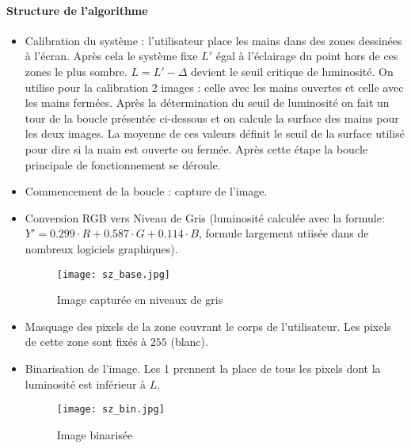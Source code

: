 \paragraph{Structure de l'algorithme}
\begin{itemize}
    \item  Calibration du système : l'utilisateur place les mains dans des zones dessinées à l'écran. Après cela le système fixe $L'$ égal à l'éclairage du point hors de ces zones le plus sombre. $L=L'-\Delta$ devient le seuil critique de luminosité. On utilise pour la calibration 2 images : celle avec les mains ouvertes et celle avec les mains fermées. Après la détermination du seuil de luminosité on fait un tour de la boucle présentée ci-dessous et on calcule la surface des mains pour les deux images. La moyenne de ces valeurs définit le seuil de la surface utilisé pour dire si la main est ouverte ou fermée. Après cette étape la boucle principale de fonctionnement se déroule.
    \item Commencement de la boucle : capture de l'image.
    \item Conversion RGB vers Niveau de Gris (luminosité calculée avec la formule: $Y'=0.299 \cdot R + 0.587 \cdot G +  0.114 \cdot B$, formule largement utiisée dans de nombreux logiciels graphiques). 
    
		\begin{figure}[h!]
    		\centering
    		\texttt{[image: sz\_base.jpg]}
    		\caption{Image capturée en niveaux de gris}
		\end{figure}

    \item Masquage des pixels de la zone couvrant le corps de l'utilisateur. Les pixels de cette zone sont fixés à $255$ (blanc).
    
    \item Binarisation de l'image. Les 1 prennent la place de tous les pixels dont la luminosité est inférieur à $L$.
    
		\begin{figure}[h!]
    		\centering
    		\texttt{[image: sz\_bin.jpg]}
    		\caption{Image binarisée}
		\end{figure}
    

\end{itemize}
